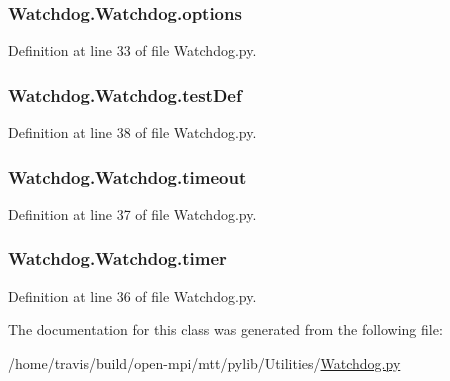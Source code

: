 \hypertarget{classWatchdog_1_1Watchdog_a5ceb06fde29b89623d7a230ae080abe6}{
\subsubsection[{options}]{\setlength{\rightskip}{0pt plus 5cm}Watchdog.\-Watchdog.\-options}}\label{classWatchdog_1_1Watchdog_a5ceb06fde29b89623d7a230ae080abe6}


Definition at line 33 of file Watchdog.\-py.

\hypertarget{classWatchdog_1_1Watchdog_abc547688f9ff2ab9350b028c6f122997}{
\subsubsection[{test\-Def}]{\setlength{\rightskip}{0pt plus 5cm}Watchdog.\-Watchdog.\-test\-Def}}\label{classWatchdog_1_1Watchdog_abc547688f9ff2ab9350b028c6f122997}


Definition at line 38 of file Watchdog.\-py.

\hypertarget{classWatchdog_1_1Watchdog_a62dc7dad113fcda93fe4f8855ac037db}{
\subsubsection[{timeout}]{\setlength{\rightskip}{0pt plus 5cm}Watchdog.\-Watchdog.\-timeout}}\label{classWatchdog_1_1Watchdog_a62dc7dad113fcda93fe4f8855ac037db}


Definition at line 37 of file Watchdog.\-py.

\hypertarget{classWatchdog_1_1Watchdog_ae03efeba550ed8039ab79a8414b8be82}{
\subsubsection[{timer}]{\setlength{\rightskip}{0pt plus 5cm}Watchdog.\-Watchdog.\-timer}}\label{classWatchdog_1_1Watchdog_ae03efeba550ed8039ab79a8414b8be82}


Definition at line 36 of file Watchdog.\-py.



The documentation for this class was generated from the following file\-:\begin{DoxyCompactItemize}
\item 
/home/travis/build/open-\/mpi/mtt/pylib/\-Utilities/\hyperlink{Watchdog_8py}{Watchdog.\-py}\end{DoxyCompactItemize}
